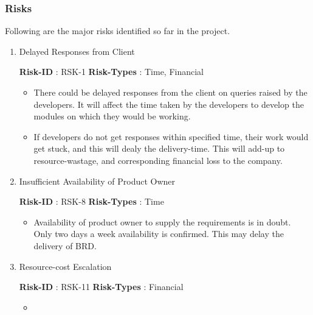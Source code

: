 \documentclass{article}%
\makeatletter
\newcommand{\tinytosmall}{%
  \fontsize
    {\fpeval{(\f@size@tiny+\f@size@small)/2}}
    {\fpeval{(\f@baselineskip@tiny+\f@baselineskip@small)/2}}%
  \selectfont
}
\makeatother
\begin{document}
\subsubsection{Risks}%

%
\par%
Following are the major risks identified so far in the project.%
\begin{enumerate}%
\item%
\hypertarget{ID:1427984926}{}%
Delayed Responses from Client%
\begin{fancybox}{\small \faChevronCircleRight \normalsize \xspace %
\tinytosmall%
\textbf{Risk{-}ID}%
: %
\xspace%
RSK{-}1%
\normalsize%
}%
\tinytosmall%
\textbf{Risk{-}Types}%
: %
\xspace%
Time, Financial%
\normalsize%
\begin{itemize}%
\item%
There could be delayed responses from the client on queries raised by the developers. It will affect the time taken by the developers to develop the modules on which they would be working.%
\item%
If developers do not get responses within specified time, their work would get stuck, and this will dealy the delivery{-}time. This will add{-}up to resource{-}wastage, and corresponding financial loss to the company.%
\end{itemize}%
\end{fancybox}%
\item%
\hypertarget{ID:1266748250}{}%
Insufficient Availability of Product Owner%
\begin{fancybox}{\small \faChevronCircleRight \normalsize \xspace %
\tinytosmall%
\textbf{Risk{-}ID}%
: %
\xspace%
RSK{-}8%
\normalsize%
}%
\tinytosmall%
\textbf{Risk{-}Types}%
: %
\xspace%
Time%
\normalsize%
\begin{itemize}%
\item%
Availability of product owner to supply the requirements is in doubt. Only two days a week availability is confirmed. This may delay the delivery of BRD.%
\end{itemize}%
\end{fancybox}%
\item%
\hypertarget{ID:1142522615}{}%
Resource{-}cost Escalation%
\begin{fancybox}{\small \faChevronCircleRight \normalsize \xspace %
\tinytosmall%
\textbf{Risk{-}ID}%
: %
\xspace%
RSK{-}11%
\normalsize%
}%
\tinytosmall%
\textbf{Risk{-}Types}%
: %
\xspace%
Financial%
\normalsize%
\begin{itemize}%
\item%

\end{itemize}
\end{fancybox}
\end{enumerate}
\end{document}
